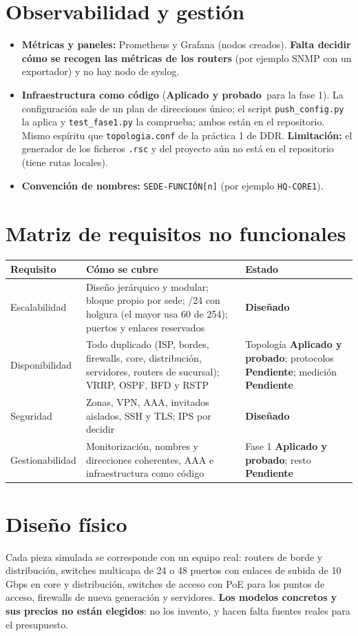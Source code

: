 \documentclass[11pt,a4paper]{article}
\newcommand{\cod}[1]{\texttt{#1}}
\newcommand{\ok}{\textcolor{verde}{\textbf{Aplicado y probado}}}
\newcommand{\dis}{\textcolor{azul}{\textbf{Diseñado}}}
\newcommand{\pen}{\textcolor{rojo}{\textbf{Pendiente}}}
\begin{document}
\section{Observabilidad y gestión}
\begin{itemize}
\item \textbf{Métricas y paneles:} Prometheus y Grafana (nodos creados). \textbf{Falta decidir cómo se recogen las métricas de los routers} (por ejemplo SNMP con un exportador) y no hay nodo de syslog.
\item \textbf{Infraestructura como código} (\ok\ para la fase 1). La configuración sale de un plan de direcciones único; el script \cod{push\_config.py} la aplica y \cod{test\_fase1.py} la comprueba; ambos están en el repositorio. Mismo espíritu que \cod{topologia.conf} de la práctica 1 de DDR. \textbf{Limitación:} el generador de los ficheros \cod{.rsc} y del proyecto aún no está en el repositorio (tiene rutas locales).
\item \textbf{Convención de nombres:} \cod{SEDE-FUNCIÓN[n]} (por ejemplo \cod{HQ-CORE1}).
\end{itemize}

\section{Matriz de requisitos no funcionales}\label{sec:nofun}
\begingroup\footnotesize
\begin{longtable}{@{}p{2.4cm}p{9.4cm}p{4.7cm}@{}}
\toprule
\textbf{Requisito} & \textbf{Cómo se cubre} & \textbf{Estado}\\
\midrule
\endhead
Escalabilidad & Diseño jerárquico y modular; bloque propio por sede; /24 con holgura (el mayor usa 60 de 254); puertos y enlaces reservados & \dis\\
Disponibilidad & Todo duplicado (ISP, bordes, firewalls, core, distribución, servidores, routers de sucursal); VRRP, OSPF, BFD y RSTP & Topología \ok; protocolos \pen; medición \pen\\
Seguridad & Zonas, VPN, AAA, invitados aislados, SSH y TLS; IPS por decidir & \dis\\
Gestionabilidad & Monitorización, nombres y direcciones coherentes, AAA e infraestructura como código & Fase 1 \ok; resto \pen\\
\bottomrule
\end{longtable}
\endgroup

\section{Diseño físico}
Cada pieza simulada se corresponde con un equipo real: routers de borde y distribución, switches multicapa de 24 o 48 puertos con enlaces de subida de 10\,Gbps en core y distribución, switches de acceso con PoE para los puntos de acceso, firewalls de nueva generación y servidores. \textbf{Los modelos concretos y sus precios no están elegidos}: no los invento, y hacen falta fuentes reales para el presupuesto.
\end{document}
